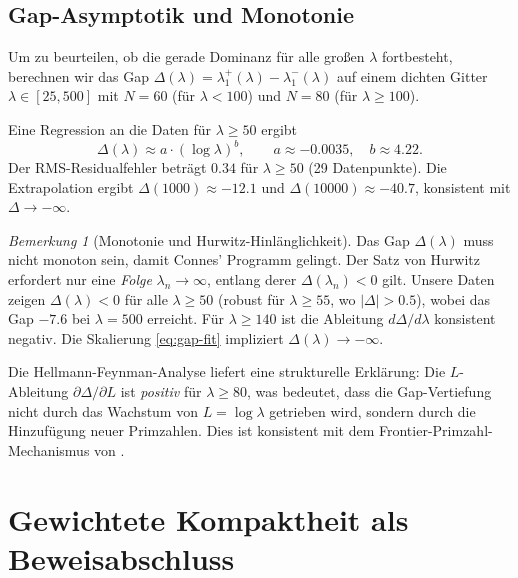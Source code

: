 \documentclass[12pt,a4paper]{article}
\theoremstyle{definition}
\theoremstyle{remark}
\newtheorem{remark}[theorem]{Bemerkung}
\begin{document}
\subsection{Gap-Asymptotik und Monotonie}
\label{sec:gap-asymptotics}

Um zu beurteilen, ob die gerade Dominanz für alle großen $\lambda$ fortbesteht, berechnen wir das Gap $\Delta(\lambda) = \lambda_1^+(\lambda) - \lambda_1^-(\lambda)$ auf einem dichten Gitter $\lambda \in [25, 500]$ mit $N = 60$ (für $\lambda < 100$) und $N = 80$ (für $\lambda \geq 100$).

Eine Regression an die Daten für $\lambda \geq 50$ ergibt
\begin{equation}
\label{eq:gap-fit}
\Delta(\lambda) \approx a \cdot (\log\lambda)^b, \qquad a \approx -0.0035,\quad b \approx 4.22.
\end{equation}
Der RMS-Residualfehler beträgt $0.34$ für $\lambda \geq 50$ (29 Datenpunkte). Die Extrapolation ergibt $\Delta(1000) \approx -12.1$ und $\Delta(10000) \approx -40.7$, konsistent mit $\Delta \to -\infty$.

\begin{remark}[Monotonie und Hurwitz-Hinlänglichkeit]
\label{rem:hurwitz}
Das Gap $\Delta(\lambda)$ muss nicht monoton sein, damit Connes' Programm gelingt. Der Satz von Hurwitz erfordert nur eine \emph{Folge} $\lambda_n \to \infty$, entlang derer $\Delta(\lambda_n) < 0$ gilt. Unsere Daten zeigen $\Delta(\lambda) < 0$ für alle $\lambda \geq 50$ (robust für $\lambda \geq 55$, wo $|\Delta| > 0.5$), wobei das Gap $-7.6$ bei $\lambda = 500$ erreicht. Für $\lambda \geq 140$ ist die Ableitung $d\Delta/d\lambda$ konsistent negativ. Die Skalierung \eqref{eq:gap-fit} impliziert $\Delta(\lambda) \to -\infty$.

Die Hellmann-Feynman-Analyse liefert eine strukturelle Erklärung: Die $L$-Ableitung $\partial\Delta/\partial L$ ist \emph{positiv} für $\lambda \geq 80$, was bedeutet, dass die Gap-Vertiefung nicht durch das Wachstum von $L = \log\lambda$ getrieben wird, sondern durch die Hinzufügung neuer Primzahlen. Dies ist konsistent mit dem Frontier-Primzahl-Mechanismus von .
\end{remark}

\section{Gewichtete Kompaktheit als Beweisabschluss}
\label{sec:weighted-compactness}
\end{document}

